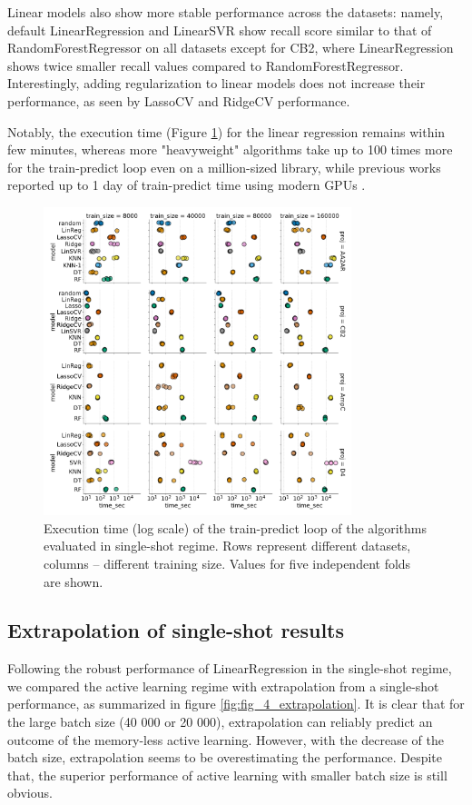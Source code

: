 Linear models also show more stable performance across the datasets: namely, default LinearRegression and LinearSVR show recall score similar to that of RandomForestRegressor on all datasets except for CB2, where LinearRegression shows twice smaller recall values compared to RandomForestRegressor. Interestingly, adding regularization to linear models does not increase their performance, as seen by LassoCV and RidgeCV performance.

Notably, the execution time (Figure \ref{fig:supp_fig_1_execution_time}) for the linear regression remains within few minutes, whereas more "heavyweight" algorithms take up to 100 times more for the train-predict loop even on a million-sized library, while previous works reported up to 1 day of train-predict time using modern GPUs \cite{deepdocking}.

\begin{figure}[ht]
\centering
\includegraphics[width=0.8\textwidth]{figures/Supp_Figure_1_execution_time.png}
\caption{Execution time (log scale) of the train-predict loop of the algorithms evaluated in single-shot regime. Rows represent different datasets, columns -- different training size. Values for five independent folds are shown.}
\label{fig:supp_fig_1_execution_time}
\end{figure}

\subsection{Extrapolation of single-shot results}
Following the robust performance of LinearRegression in the single-shot regime, we compared the active learning regime with extrapolation from a single-shot performance, as summarized in figure \ref{fig:fig_4_extrapolation}. It is clear that for the large batch size (40 000 or 20 000), extrapolation can reliably predict an outcome of the memory-less active learning. However, with the decrease of the batch size, extrapolation seems to be overestimating the performance. Despite that, the superior performance of active learning with smaller batch size is still obvious.

